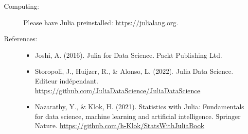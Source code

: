 \documentclass[onecolumn, hidelinks, 12pt]{article}
\begin{document}
\begin{description}
\item[Computing:]
  Please have Julia preinstalled:
  \url{https://julialang.org}. 

\item[References:] \hspace{0pt}
  
  \begin{itemize}
  \item
    Joshi, A. (2016). Julia for Data Science. Packt Publishing Ltd.
  \item
    Storopoli, J., Huijzer, R., \& Alonso, L. (2022). Julia Data Science. Editeur indépendant.
    \url{https://github.com/JuliaDataScience/JuliaDataScience}
  \item
    Nazarathy, Y., \& Klok, H. (2021). Statistics with Julia: Fundamentals for data science, machine learning and artificial intelligence. Springer Nature.
    \url{https://github.com/h-Klok/StatsWithJuliaBook}
  \end{itemize}
  

\end{description}
\end{document}
